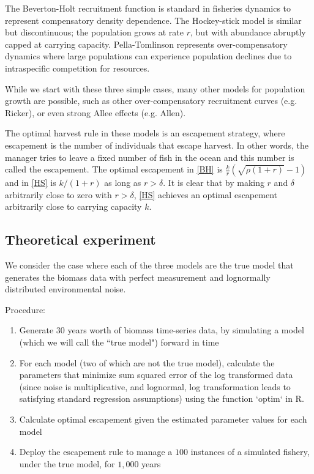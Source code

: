 \documentclass[]{elsarticle} %
\begin{document}
The Beverton-Holt recruitment function is standard in fisheries dynamics to represent compensatory density dependence. The Hockey-stick model is similar but discontinuous; the population grows at rate $r$, but with abundance abruptly capped at carrying capacity. Pella-Tomlinson represents over-compensatory dynamics where large populations can experience population declines due to intraspecific competition for resources. 

While we start with these three simple cases, many other models for population growth are possible, such as other over-compensatory recruitment curves (e.g. Ricker), or even strong Allee effects (e.g. Allen).

%

The optimal harvest rule in these models is an escapement strategy, where escapement is the number of individuals that escape harvest. In other words, the manager tries to leave a fixed number of fish in the ocean and this number is called the escapement. The optimal escapement in \eqref{BH} is $\frac{k}{r} ( \sqrt{ \rho (1+r) } - 1)$ and in \eqref{HS} is $k/(1+r)$ as long as $r>\delta$. It is clear that by making $r$ and $\delta$ arbitrarily close to zero with $r>\delta$, \eqref{HS} achieves an optimal escapement arbitrarily close to carrying capacity $k$. 

\subsection{Theoretical experiment}
We consider the case where each of the three models are the true model that generates the biomass data with perfect measurement and lognormally distributed environmental noise. 

Procedure:
\begin{enumerate}
	\item Generate $30$ years worth of biomass time-series data, by simulating a model (which we will call the ``true model") forward in time
	\item For each model (two of which are not the true model), calculate the parameters that minimize sum squared error of the log transformed data (since noise is multiplicative, and lognormal, log transformation leads to satisfying standard regression assumptions) using the function `optim` in R.
	\item Calculate optimal escapement given the estimated parameter values for each model
	\item Deploy the escapement rule to manage a $100$ instances of a simulated fishery, under the true model, for $1,000$ years
\end{enumerate}
\end{document}
